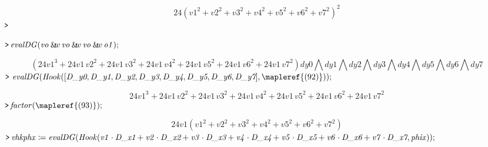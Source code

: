 \documentclass{article}
\begin{document}
\begin{dmath}\label{(91)}
24 \left(\mathit{v1}^{2}+\mathit{v2}^{2}+\mathit{v3}^{2}+\mathit{v4}^{2}+\mathit{v5}^{2}+\mathit{v6}^{2}+\mathit{v7}^{2}\right)^{2}
\end{dmath}
\mapleinput
{$ \displaystyle \texttt{>\,}  $}

\mapleinput
{$ \displaystyle \texttt{>\,} \mathit{evalDG} (\mathit{vo} \:\&\!\!w \,\mathit{vo} \:\&\!\!w \,\mathit{vo} \:\&\!\!w \,\mathit{o1}); $}

\begin{dmath}\label{(92)}
\left(24 \mathit{v1}^{3}+24 \mathit{v1} \,\mathit{v2}^{2}+24 \mathit{v1} \,\mathit{v3}^{2}+24 \mathit{v1} \,\mathit{v4}^{2}+24 \mathit{v1} \,\mathit{v5}^{2}+24 \mathit{v1} \,\mathit{v6}^{2}+24 \mathit{v1} \,\mathit{v7}^{2}\right) \mathit{dy0}  \bigwedge  \mathit{dy1}  \bigwedge  \mathit{dy2}  \bigwedge  \mathit{dy3}  \bigwedge  \mathit{dy4}  \bigwedge  \mathit{dy5}  \bigwedge  \mathit{dy6}  \bigwedge  \mathit{dy7} 
\end{dmath}
\mapleinput
{$ \displaystyle \texttt{>\,} \,\mathit{evalDG} (\mathit{Hook} ([\textit{D\_y0} ,\textit{D\_y1} ,\textit{D\_y2} ,\textit{D\_y3} ,\textit{D\_y4} ,\textit{D\_y5} ,\textit{D\_y6} ,\textit{D\_y7}],\mapleref{(92)})); $}

\begin{dmath}\label{(93)}
24 \mathit{v1}^{3}+24 \mathit{v1} \,\mathit{v2}^{2}+24 \mathit{v1} \,\mathit{v3}^{2}+24 \mathit{v1} \,\mathit{v4}^{2}+24 \mathit{v1} \,\mathit{v5}^{2}+24 \mathit{v1} \,\mathit{v6}^{2}+24 \mathit{v1} \,\mathit{v7}^{2}
\end{dmath}
\mapleinput
{$ \displaystyle \texttt{>\,} \mathit{factor} (\mapleref{(93)}); $}

\begin{dmath}\label{(94)}
24 \mathit{v1} \left(\mathit{v1}^{2}+\mathit{v2}^{2}+\mathit{v3}^{2}+\mathit{v4}^{2}+\mathit{v5}^{2}+\mathit{v6}^{2}+\mathit{v7}^{2}\right)
\end{dmath}
\mapleinput
{$ \displaystyle \texttt{>\,} \mathit{vhkphx} \coloneqq \mathit{evalDG} (\mathit{Hook} (\mathit{v1} \cdot \textit{D\_x1} +\mathit{v2} \cdot \textit{D\_x2} +\mathit{v3} \cdot \textit{D\_x3} +\mathit{v4} \cdot \textit{D\_x4} +\mathit{v5} \cdot \textit{D\_x5} +\mathit{v6} \cdot \textit{D\_x6} +\mathit{v7} \cdot \textit{D\_x7} ,\mathit{phix})); $}
\end{document}

